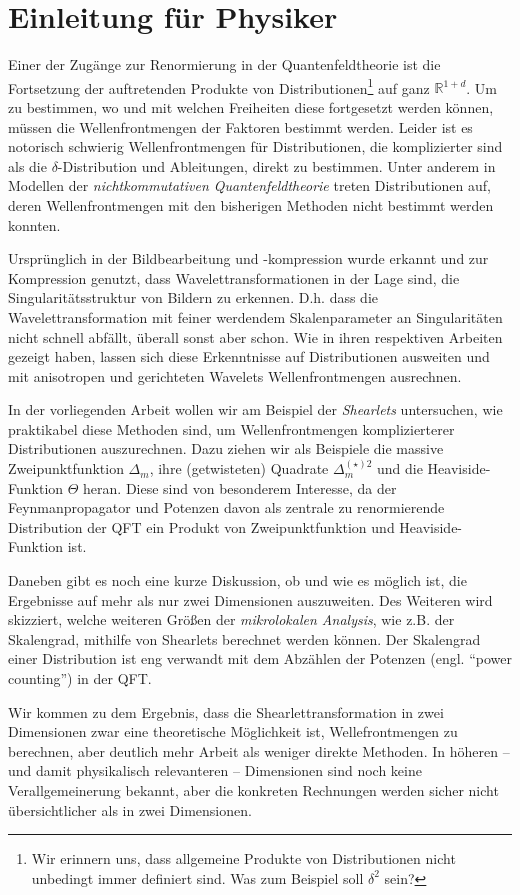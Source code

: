 
\chapter{Einleitung für Physiker} %
\label{sec:einleitung_physics}
Einer der Zugänge zur Renormierung in der Quantenfeldtheorie ist die Fortsetzung der auftretenden Produkte von Distributionen\footnote{Wir erinnern uns, dass allgemeine Produkte von Distributionen nicht unbedingt immer definiert sind. Was zum Beispiel soll \(\delta^2\) sein?} auf ganz $\mathbb{R}^{1+d}$. Um zu bestimmen, wo und mit welchen Freiheiten diese fortgesetzt werden können, müssen die Wellenfrontmengen der Faktoren bestimmt werden. Leider ist es notorisch schwierig Wellenfrontmengen für Distributionen, die komplizierter sind als die $\delta$-Distribution und Ableitungen, direkt zu bestimmen. Unter anderem in Modellen der \emph{nichtkommutativen Quantenfeldtheorie} \cite{kappaMinkowski,Doplicher1995,StringLocalized} treten Distributionen auf, deren Wellenfrontmengen mit den bisherigen Methoden nicht bestimmt werden konnten.

Ursprünglich in der Bildbearbeitung und -kompression wurde erkannt und zur Kompression genutzt, dass Wavelettransformationen in der Lage sind, die Singularitätsstruktur von Bildern zu erkennen. D.h. dass die Wavelettransformation mit feiner werdendem Skalenparameter an Singularitäten nicht schnell abfällt, überall sonst aber schon.
Wie \textcite{Kutyniok2008,Candes2005,Contourlets} in ihren respektiven Arbeiten gezeigt haben, lassen sich diese Erkenntnisse auf Distributionen ausweiten und mit anisotropen und gerichteten Wavelets Wellenfrontmengen ausrechnen.

In der vorliegenden Arbeit wollen wir am Beispiel der \emph{Shearlets} untersuchen, wie praktikabel diese Methoden sind, um Wellenfrontmengen komplizierterer Distributionen auszurechnen. Dazu ziehen wir als Beispiele die massive Zweipunktfunktion \(\Delta_m\), ihre (getwisteten) Quadrate \(\Delta_m^{(\star) 2}\) und die Heaviside-Funktion \(\Theta\) heran. Diese sind von besonderem Interesse, da der Feynmanpropagator und Potenzen davon als zentrale zu renormierende Distribution der QFT ein Produkt von Zweipunktfunktion und Heaviside-Funktion ist.

Daneben gibt es noch eine kurze Diskussion, ob und wie es möglich ist, die Ergebnisse auf mehr als nur zwei Dimensionen auszuweiten.
Des Weiteren wird skizziert, welche weiteren Größen der \emph{mikrolokalen Analysis}, wie z.B. der Skalengrad, mithilfe von Shearlets berechnet werden können. Der Skalengrad einer Distribution ist eng verwandt mit dem Abzählen der Potenzen (engl. "`power counting"') in der QFT.

Wir kommen zu dem Ergebnis, dass die Shearlettransformation in zwei Dimensionen zwar eine theoretische Möglichkeit ist, Wellefrontmengen zu berechnen, aber deutlich mehr Arbeit als weniger direkte Methoden. In höheren -- und damit physikalisch relevanteren -- Dimensionen sind noch keine Verallgemeinerung bekannt, aber die konkreten Rechnungen werden sicher nicht übersichtlicher als in zwei Dimensionen.


